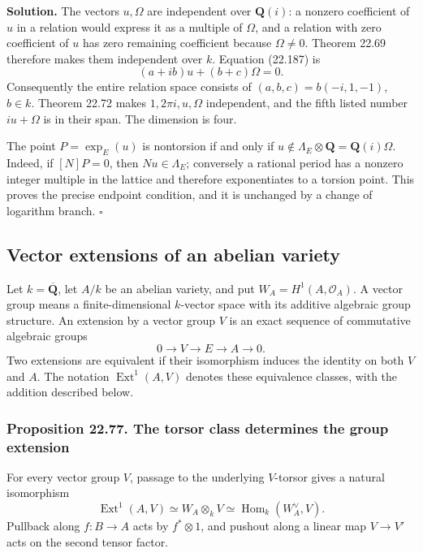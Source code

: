 \documentclass[
  11pt,
  a4paper,
]{article}
\begin{document}
\textbf{Solution.} The vectors \(u,\Omega\) are independent over
\(\mathbf Q(i)\): a nonzero coefficient of \(u\) in a relation would
express it as a multiple of \(\Omega\), and a relation with zero
coefficient of \(u\) has zero remaining coefficient because
\(\Omega\ne0\). Theorem 22.69 therefore makes them independent over
\(k\). Equation (22.187) is \[
 (a+ib)u+(b+c)\Omega=0.
 \tag{22.188}
\] Consequently the entire relation space consists of
\((a,b,c)=b(-i,1,-1)\), \(b\in k\). Theorem 22.72 makes
\(1,2\pi i,u,\Omega\) independent, and the fifth listed number
\(iu+\Omega\) is in their span. The dimension is four.

The point \(P=\exp_E(u)\) is nontorsion if and only if
\(u\notin\Lambda_E\otimes\mathbf Q=\mathbf Q(i)\Omega\). Indeed, if
\([N]P=0\), then \(Nu\in\Lambda_E\); conversely a rational period has a
nonzero integer multiple in the lattice and therefore exponentiates to a
torsion point. This proves the precise endpoint condition, and it is
unchanged by a change of logarithm branch. \(\square\)

\subsection{Vector extensions of an abelian
variety}\label{vector-extensions-of-an-abelian-variety}

Let \(k=\overline{\mathbf Q}\), let \(A/k\) be an abelian variety, and
put \(W_A=H^1(A,\mathcal O_A)\). A vector group means a
finite-dimensional \(k\)-vector space with its additive algebraic group
structure. An extension by a vector group \(V\) is an exact sequence of
commutative algebraic groups \[
 0\longrightarrow V\longrightarrow E\longrightarrow A\longrightarrow0.
 \tag{22.189}
\] Two extensions are equivalent if their isomorphism induces the
identity on both \(V\) and \(A\). The notation
\(\operatorname{Ext}^1(A,V)\) denotes these equivalence classes, with
the addition described below.

\subsubsection{Proposition 22.77. The torsor class determines the group
extension}\label{proposition-22.77.-the-torsor-class-determines-the-group-extension}

For every vector group \(V\), passage to the underlying \(V\)-torsor
gives a natural isomorphism \[
 \operatorname{Ext}^1(A,V)\simeq W_A\otimes_k V
       \simeq\operatorname{Hom}_k(W_A^\vee,V).
 \tag{22.190}
\] Pullback along \(f:B\to A\) acts by \(f^*\otimes1\), and pushout
along a linear map \(V\to V'\) acts on the second tensor factor.
\end{document}
